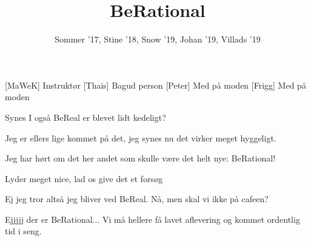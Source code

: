 \documentclass[a4paper,11pt]{article}
\title{BeRational}
\author{Sommer '17, Stine '18, Snow '19, Johan '19, Villads '19}
\begin{document}
\maketitle

\begin{roles}
[MaWeK] Instruktør
[Thais] Bagud person
[Peter] Med på moden
[Frigg] Med på moden
\end{roles}

\begin{props}
\end{props}


\begin{sketch}

 Synes I også BeReal er blevet lidt kedeligt?

 Jeg er ellers lige kommet på det, jeg synes nu det virker meget hyggeligt.

 Jeg har hørt om det her andet som skulle være det helt nye: BeRational!

 Lyder meget nice, lad os give det et forsøg


 Ej jeg tror altså jeg bliver ved BeReal. Nå, men skal vi ikke på cafeen?


 Ejjjjj der er BeRational... Vi må hellere få lavet aflevering og kommet ordentlig tid i seng.

\end{sketch}
\end{document}
